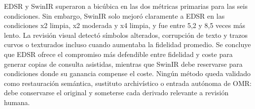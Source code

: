 EDSR y SwinIR superaron a bicúbica en las dos métricas primarias para las seis condiciones. Sin
embargo, SwinIR solo mejoró claramente a EDSR en las condiciones x2 limpia, x2 moderada y x4 limpia,
y fue entre 5,2 y 8,5 veces más lento. La revisión visual detectó símbolos alterados, corrupción de
texto y trazos curvos o texturados incluso cuando aumentaba la fidelidad promedio. Se concluye que
EDSR ofrece el compromiso más defendible entre fidelidad y coste para generar copias de consulta
asistidas, mientras que SwinIR debe reservarse para condiciones donde su ganancia compense el
coste. Ningún método queda validado como restauración semántica, sustituto archivístico o entrada
autónoma de OMR: debe conservarse el original y someterse cada derivado relevante a revisión humana.
